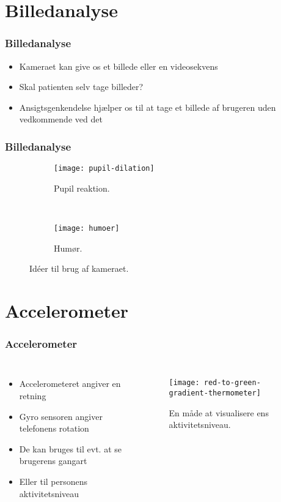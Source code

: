 \section{Billedanalyse}

\begin{frame}
\frametitle{Billedanalyse}
\begin{itemize}
\item Kameraet kan give os et billede eller en videosekvens
\item Skal patienten selv tage billeder?
\item Ansigtsgenkendelse hjælper os til at tage et billede af brugeren uden vedkommende ved det

\end{itemize}
\end{frame}


\begin{frame}
\frametitle{Billedanalyse}
\begin{figure}
\centering
\begin{subfigure}[b]{0.45\textwidth}
	\centering
\texttt{[image: pupil-dilation]}
\caption{Pupil reaktion.}
\end{subfigure}
~~~~
\begin{subfigure}[b]{0.45\textwidth}
	\centering
\texttt{[image: humoer]}
\caption{Humør.}
\end{subfigure}
\caption{Idéer til brug af kameraet.}
\end{figure}

\end{frame}

\section{Accelerometer}
\begin{frame}[fragile]
\frametitle{Accelerometer}
\begin{columns}
\column[t]{5cm}
\begin{itemize}
\item Accelerometeret angiver en retning
\item Gyro sensoren angiver telefonens rotation
\item De kan bruges til evt. at se brugerens gangart
\item Eller til personens aktivitetsniveau
\end{itemize}

\column[t]{5cm}
\begin{figure}
\texttt{[image: red-to-green-gradient-thermometer]}
\caption{En måde at visualisere ens aktivitetsniveau.}
\end{figure}
\end{columns}
\end{frame}



